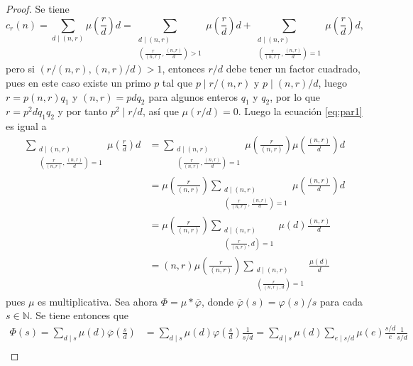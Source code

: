 \begin{proof}
Se tiene
\begin{equation}\label{eq:par1}
    c_r (n) = \sum_{d \mid (n,r)} \mu \left( \frac{r}{d} \right) d = \sum_{\substack{d \mid (n,r) \\ \left( \frac{r}{(n,r)}, \frac{(n,r)}{d} \right) > 1}} \mu \left( \frac{r}{d} \right) d + \sum_{\substack{d \mid (n,r) \\ \left( \frac{r}{(n,r)}, \frac{(n,r)}{d} \right) = 1}} \mu \left( \frac{r}{d} \right) d,
\end{equation}
pero si $(r/(n,r),(n,r)/d)>1$, entonces $r/d$ debe tener un factor cuadrado, pues en este caso existe un primo $p$ tal que $p \mid r/(n,r)$ y $p \mid (n,r)/d$, luego $r=p (n,r) q_1$ y $(n,r)=p d q_2$ para algunos enteros $q_1$ y $q_2$, por lo que $r=p^2 d q_1 q_2$ y por tanto $p^2 \mid r/d$, así que $\mu(r/d)=0$. Luego la ecuación \eqref{eq:par1} es igual a
\begin{equation}\label{eq:par2}
\begin{split}
    \sum_{\substack{d \mid (n,r) \\ \left( \frac{r}{(n,r)}, \frac{(n,r)}{d} \right) = 1}} \mu \left( \frac{r}{d} \right) d & = \sum_{\substack{d \mid (n,r) \\ \left( \frac{r}{(n,r)}, \frac{(n,r)}{d} \right) = 1}} \mu \left( \frac{r}{(n,r)} \right) \mu \left( \frac{(n,r)}{d} \right) d \\
    & = \mu \left( \frac{r}{(n,r)} \right) \sum_{\substack{d \mid (n,r) \\ \left( \frac{r}{(n,r)}, \frac{(n,r)}{d} \right) = 1}} \mu \left( \frac{(n,r)}{d} \right) d \\
    & = \mu \left( \frac{r}{(n,r)} \right) \sum_{\substack{d \mid (n,r) \\ \left( \frac{r}{(n,r)},d \right)=1}} \mu(d) \frac{(n,r)}{d} \\
    & = (n,r) \mu \left( \frac{r}{(n,r)} \right) \sum_{\substack{d \mid (n,r) \\ \left( \frac{r}{(n,r),d} \right)=1}} \frac{\mu(d)}{d}
\end{split}
\end{equation}
pues $\mu$ es multiplicativa. Sea ahora $\Phi=\mu * \overline{\varphi}$, donde $\overline{\varphi}(s)=\varphi(s)/s$ para cada $s \in \mathbb{N}$. Se tiene entonces que
\begin{equation}\label{eq:par3}
\begin{split}
    \Phi(s) = \sum_{d \mid s} \mu(d) \overline{\varphi} \left( \frac{s}{d} \right) & = \sum_{d \mid s} \mu(d) \varphi \left( \frac{s}{d} \right) \frac{1}{s/d} = \sum_{d \mid s} \mu(d) \sum_{e \mid s/d} \mu(e) \frac{s/d}{e} \frac{1}{s/d} \\

\end{split}
\end{equation}
\end{proof}
